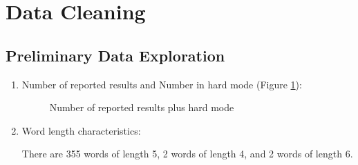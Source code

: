 \documentclass[
  journal=medium,
  manuscript=Report,
  year=2023,
  volume=37,
]{cup-journal}
\begin{document}
\section{Data Cleaning}

\subsection{Preliminary Data Exploration}

\begin{enumerate}
    \item Number of reported results and Number in hard mode (Figure \ref{combine}):
    
    \begin{figure}[!htbp]
        \centering
        \hfill
        \caption{Number of reported results plus hard mode}
        \label{combine}
    \end{figure}

    \item Word length characteristics:
    
    There are 355 words of length 5, 2 words of length 4, and 2 words of length 6.

\end{enumerate}
\end{document}
